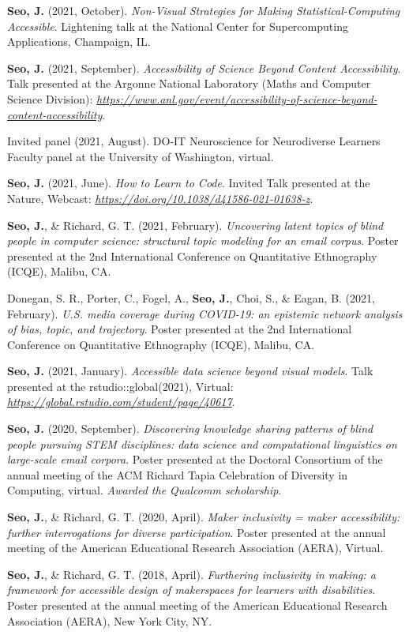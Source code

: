 \documentclass[11pt,a4paper,]{awesome-cv}
\begin{document}
\textbf{Seo, J.} (2021, October). \emph{Non-Visual Strategies for Making
  Statistical-Computing Accessible}. Lightening talk at the National
Center for Supercomputing Applications, Champaign, IL.

\textbf{Seo, J.} (2021, September). \emph{Accessibility of Science
  Beyond Content Accessibility}. Talk presented at the Argonne National
Laboratory (Maths and Computer Science Division):
\emph{\url{https://www.anl.gov/event/accessibility-of-science-beyond-content-accessibility}}.

Invited panel (2021, August). DO-IT Neuroscience for Neurodiverse
Learners Faculty panel at the University of Washington, virtual.

\textbf{Seo, J.} (2021, June). \emph{How to Learn to Code}. Invited Talk
presented at the Nature, Webcast:
\emph{\url{https://doi.org/10.1038/d41586-021-01638-z}}.

\textbf{Seo, J.}, \& Richard, G. T. (2021, February). \emph{Uncovering
  latent topics of blind people in computer science: structural topic
  modeling for an email corpus}. Poster presented at the 2nd International
Conference on Quantitative Ethnography (ICQE), Malibu, CA.

Donegan, S. R., Porter, C., Fogel, A., \textbf{Seo, J.}, Choi, S., \&
Eagan, B. (2021, February). \emph{U.S. media coverage during COVID-19:
  an epistemic network analysis of bias, topic, and trajectory}. Poster
presented at the 2nd International Conference on Quantitative
Ethnography (ICQE), Malibu, CA.

\textbf{Seo, J.} (2021, January). \emph{Accessible data science beyond
  visual models}. Talk presented at the rstudio::global(2021), Virtual:
\emph{\url{https://global.rstudio.com/student/page/40617}}.

\textbf{Seo, J.} (2020, September). \emph{Discovering knowledge sharing
  patterns of blind people pursuing STEM disciplines: data science and
  computational linguistics on large-scale email corpora}. Poster
presented at the Doctoral Consortium of the annual meeting of the ACM
Richard Tapia Celebration of Diversity in Computing, virtual.
\emph{Awarded the Qualcomm scholarship}.

\textbf{Seo, J.}, \& Richard, G. T. (2020, April). \emph{Maker
  inclusivity = maker accessibility: further interrogations for diverse
  participation}. Poster presented at the annual meeting of the American
Educational Research Association (AERA), Virtual.

\textbf{Seo, J.}, \& Richard, G. T. (2018, April). \emph{Furthering
  inclusivity in making: a framework for accessible design of makerspaces
  for learners with disabilities}. Poster presented at the annual meeting
of the American Educational Research Association (AERA), New York City,
NY.
\end{document}
